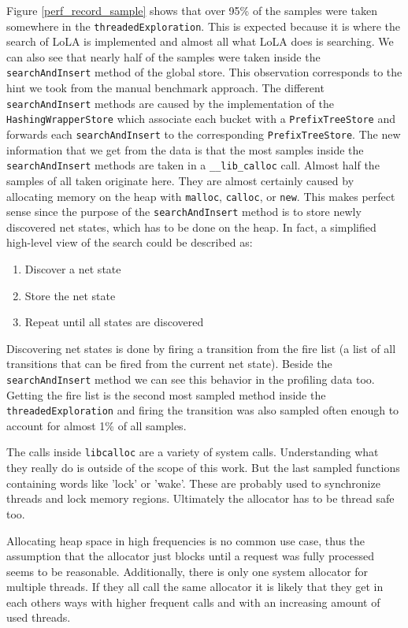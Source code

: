 Figure \ref{perf_record_sample} shows that over 95\% of the samples were taken somewhere in the \texttt{threadedExploration}. This is expected because it is where the search of LoLA is implemented and almost all what LoLA does is searching. We can also see that nearly half of the samples were taken inside the \texttt{searchAndInsert} method of the global store. This observation corresponds to the hint we took from the manual benchmark approach. The different \texttt{searchAndInsert} methods are caused by the implementation of the \texttt{Hashing\-Wrapper\-Store} which associate each bucket with a \texttt{PrefixTreeStore} and forwards each \texttt{searchAndInsert} to the corresponding \texttt{PrefixTreeStore}.
The new information that we get from the data is that the most samples inside the \texttt{searchAndInsert} methods are taken in a \texttt{\_\_lib\_calloc} call. Almost half the samples of all taken originate here. They are almost certainly caused by allocating memory on the heap with \texttt{malloc}, \texttt{calloc}, or \texttt{new}. This makes perfect sense since the purpose of the \texttt{searchAndInsert} method is to store newly discovered net states, which has to be done on the heap. In fact, a simplified high-level view of the search could be described as:
\begin{enumerate}
    \item Discover a net state
    \item Store the net state
    \item Repeat until all states are discovered
\end{enumerate}
Discovering net states is done by firing a transition from the fire list (a list of all transitions that can be fired from the current net state). Beside the \texttt{searchAndInsert} method we can see this behavior in the profiling data too. Getting the fire list is the second most sampled method inside the \texttt{threadedExploration} and firing the transition was also sampled often enough to account for almost 1\% of all samples.

The calls inside \texttt{libcalloc} are a variety of system calls. Understanding what they really do is outside of the scope of this work. But the last sampled functions containing words like 'lock' or 'wake'. These are probably used to synchronize threads and lock memory regions. Ultimately the allocator has to be thread safe too.

Allocating heap space in high frequencies is no common use case, thus the assumption that the allocator just blocks until a request was fully processed seems to be reasonable. Additionally, there is only one system allocator for multiple threads. If they all call the same allocator it is likely that they get in each others ways with higher frequent calls and with an increasing amount of used threads.

